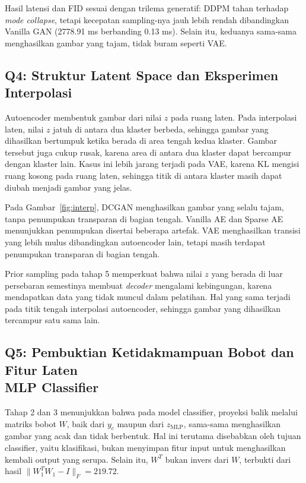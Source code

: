 \documentclass{article}
\begin{document}
Hasil latensi dan FID sesuai dengan trilema generatif: DDPM tahan terhadap \textit{mode collapse}, tetapi kecepatan sampling-nya jauh lebih rendah dibandingkan Vanilla GAN (2778.91 ms berbanding 0.13 ms). Selain itu, keduanya sama-sama menghasilkan gambar yang tajam, tidak buram seperti VAE.

\subsection{Q4: Struktur Latent Space dan Eksperimen Interpolasi}
Autoencoder membentuk gambar dari nilai $z$ pada ruang laten. Pada interpolasi laten, nilai $z$ jatuh di antara dua klaster berbeda, sehingga gambar yang dihasilkan bertumpuk ketika berada di area tengah kedua klaster. Gambar tersebut juga cukup rusak, karena area di antara dua klaster dapat bercampur dengan klaster lain. Kasus ini lebih jarang terjadi pada VAE, karena KL mengisi ruang kosong pada ruang laten, sehingga titik di antara klaster masih dapat diubah menjadi gambar yang jelas.

Pada Gambar~\ref{fig:interp}, DCGAN menghasilkan gambar yang selalu tajam, tanpa penumpukan transparan di bagian tengah. Vanilla AE dan Sparse AE menunjukkan penumpukan disertai beberapa artefak. VAE menghasilkan transisi yang lebih mulus dibandingkan autoencoder lain, tetapi masih terdapat penumpukan transparan di bagian tengah.

Prior sampling pada tahap 5 memperkuat bahwa nilai $z$ yang berada di luar persebaran semestinya membuat \textit{decoder} mengalami kebingungan, karena mendapatkan data yang tidak muncul dalam pelatihan. Hal yang sama terjadi pada titik tengah interpolasi autoencoder, sehingga gambar yang dihasilkan tercampur satu sama lain.

\subsection{Q5: Pembuktian Ketidakmampuan Bobot dan Fitur Laten\\ MLP Classifier}
Tahap 2 dan 3 menunjukkan bahwa pada model classifier, proyeksi balik melalui matriks bobot $W$, baik dari $y_c$ maupun dari $z_{\text{MLP}}$, sama-sama menghasilkan gambar yang acak dan tidak berbentuk. Hal ini terutama disebabkan oleh tujuan classifier, yaitu klasifikasi, bukan menyimpan fitur input untuk menghasilkan kembali output yang serupa. Selain itu, $W^T$ bukan invers dari $W$, terbukti dari hasil $\lVert W_1^T W_1-I\rVert_F = 219.72$.
\end{document}
